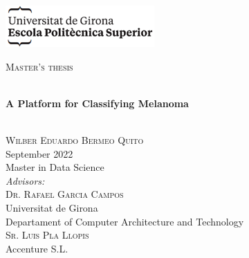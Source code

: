 \documentclass[a4paper,12pt,twoside]{ThesisStyle}
\begin{document}
\newpage
\hypersetup{pageanchor=false}
\begin{titlepage}

\includegraphics[scale=0.9]{imatges/logo_eps.png} \\[1cm]
\begin{center}
\textsc{\Large Master's thesis} \\[1cm]

\begin{spacing}{2}
\HRule \\
\textbf{\Huge A Platform for Classifying Melanoma} \\
\HRule \\[0.5cm]
\end{spacing}

{
\large
\textsc{Wilber Eduardo Bermeo Quito} \\
\small{September 2022} \\[0.75cm]
Master in Data Science \\[0.75cm]
\emph{Advisors:} \\[0.1cm]
\large
\textsc{Dr. Rafael Garcia Campos} \\
\small{Universitat de Girona} \\
\small{Departament of Computer Architecture and Technology} \\[0.5cm]

\large
\textsc{Sr. Luis Pla Llopis} \\
\small{Accenture S.L.} \\

}

\end{center}
\end{titlepage}
\hypersetup{pageanchor=true}

\titlepage









\tableofcontents

\listoffigures

\listoftables

\mainmatter


\end{document}
